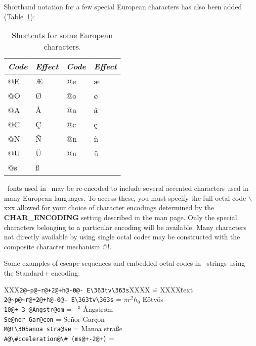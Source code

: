 Shorthand notation for a few special European characters has also been
added (Table~\ref{tbl:scand}):

\begin{table}[H]
\centering
\begin{tabular}{|l|l||l|l|} \hline
\emph{Code} & \emph{Effect}  & \emph{Code} & \emph{Effect} \\ \hline
@E &  \AE   & @e &  \ae   \\ \hline
@O &  \O    & @o &  \o    \\ \hline
@A &  \AA   & @a &  \aa   \\ \hline
@C &  \c{C} & @c &  \c{c} \\ \hline
@N &  \~{N} & @n &  \~{n} \\ \hline
@U &  \"{U} & @u &  \"{u} \\ \hline
@s &  \ss   &    &        \\ \hline
\end{tabular}
\caption{Shortcuts for some European characters.}
\label{tbl:scand}
\end{table}

\PS\ fonts used in \GMT\ may be re-encoded to include
several accented characters used in many European languages.  To
access these, you must specify the full octal code $\backslash$xxx
allowed for your choice of character encodings
determined by the \textbf{CHAR\_ENCODING} setting described
in the  man page.  Only the special characters
belonging to a particular encoding will
be available.  Many characters not directly available by
using single octal codes may be constructed with the composite
character mechanism @!.
 
Some examples of escape sequences and embedded octal codes in \GMT\ strings using the
Standard+ encoding: 

\begin{tabbing}
XXX\=\verb|2@~p@~r@+2@+h@-0@- E\363tv\363s|XXXX \== XXXX\=text \kill 
\>\verb|2@~p@~r@+2@+h@-0@- E\363tv\363s| \> = $\pi r^2h_0$ E\"{o}tv\"{o}s \\ 
\>\verb|10@+-3 @Angstr@om|		 \> =	$^{-3}$ \AA ngstr\o m \\ 
\>\verb|Se@nor Gar@con|	 \> = \> Se\~{n}or Gar\c{c}on \\ 
\>\verb|M@!\305anoa stra@se|	 \> = \> M\={a}noa stra\ss e \\ 
\>\verb|A@\#cceleration@\# (ms@+-2@+)|	 \> = \> 
\end{tabbing} 


